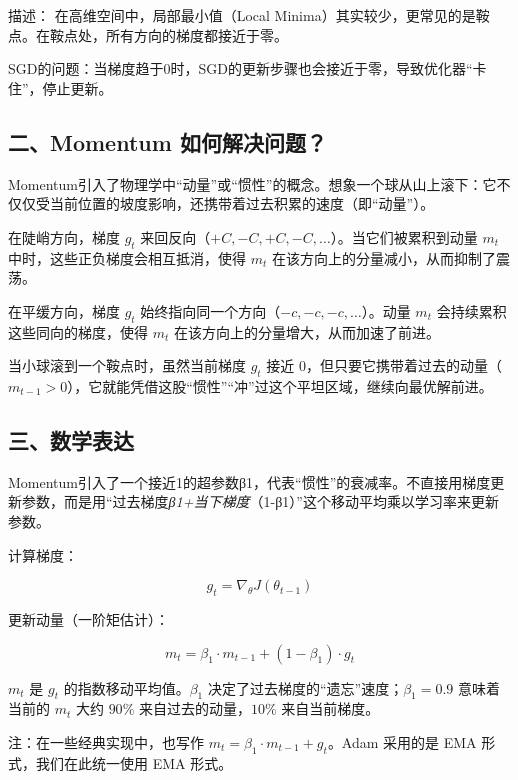 描述： 在高维空间中，局部最小值（Local Minima）其实较少，更常见的是鞍点。在鞍点处，所有方向的梯度都接近于零。

SGD的问题：当梯度趋于0时，SGD的更新步骤也会接近于零，导致优化器``卡住''，停止更新。

\hypertarget{ux4e8cmomentum-ux5982ux4f55ux89e3ux51b3ux95eeux9898}{%
\subsection{二、Momentum 如何解决问题？}\label{ux4e8cmomentum-ux5982ux4f55ux89e3ux51b3ux95eeux9898}}

Momentum引入了物理学中``动量''或``惯性''的概念。想象一个球从山上滚下：它不仅仅受当前位置的坡度影响，还携带着过去积累的速度（即``动量''）。

在陡峭方向，梯度 \(g_t\) 来回反向（\(+C, -C, +C, -C, \ldots\)）。当它们被累积到动量 \(m_t\) 中时，这些正负梯度会相互抵消，使得 \(m_t\) 在该方向上的分量减小，从而抑制了震荡。

在平缓方向，梯度 \(g_t\) 始终指向同一个方向（\(-c, -c, -c, \ldots\)）。动量 \(m_t\) 会持续累积这些同向的梯度，使得 \(m_t\) 在该方向上的分量增大，从而加速了前进。

当小球滚到一个鞍点时，虽然当前梯度 \(g_t\) 接近 \(0\)，但只要它携带着过去的动量（\(m_{t-1}>0\)），它就能凭借这股``惯性''``冲''过这个平坦区域，继续向最优解前进。

\hypertarget{ux4e09ux6570ux5b66ux8868ux8fbe}{%
\subsection{三、数学表达}\label{ux4e09ux6570ux5b66ux8868ux8fbe}}

Momentum引入了一个接近1的超参数β1，代表``惯性''的衰减率。不直接用梯度更新参数，而是用``过去梯度\emph{β1+当下梯度}（1-β1）''这个移动平均乘以学习率来更新参数。

计算梯度：

\[
g_t = \nabla_\theta J(\theta_{t-1})
\]

更新动量（一阶矩估计）：

\[
m_t = \beta_1 \cdot m_{t-1} + (1-\beta_1)\cdot g_t
\]

\(m_t\) 是 \(g_t\) 的指数移动平均值。\(\beta_1\) 决定了过去梯度的``遗忘''速度；\(\beta_1=0.9\) 意味着当前的 \(m_t\) 大约 \(90\%\) 来自过去的动量，\(10\%\) 来自当前梯度。

注：在一些经典实现中，也写作 \(m_t=\beta_1\cdot m_{t-1}+g_t\)。Adam 采用的是 EMA 形式，我们在此统一使用 EMA 形式。

